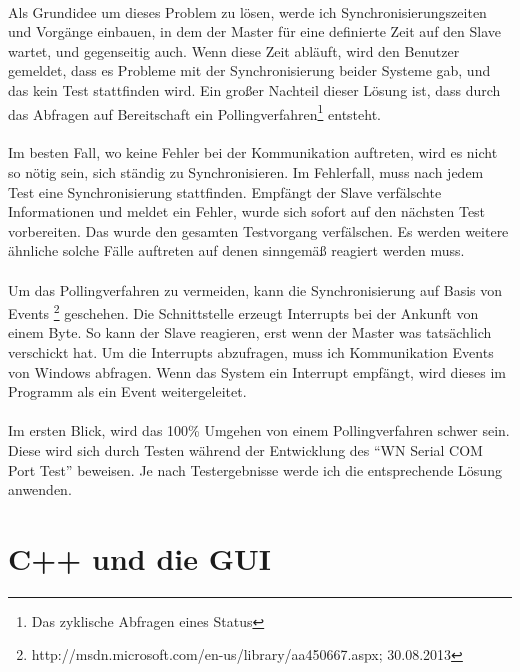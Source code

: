 \paragraph{}
Als Grundidee um dieses Problem zu lösen, werde ich Synchronisierungszeiten und Vorgänge einbauen, in dem der Master für eine definierte Zeit auf den Slave wartet, und gegenseitig auch. Wenn diese Zeit abläuft, wird den Benutzer gemeldet, dass es Probleme mit der Synchronisierung beider Systeme gab, und das kein Test stattfinden wird. Ein großer Nachteil dieser Lösung ist, dass durch das Abfragen auf Bereitschaft ein Pollingverfahren\footnote{Das zyklische Abfragen eines Status} entsteht. 

\paragraph{}
Im besten Fall, wo keine Fehler bei der Kommunikation auftreten, wird es nicht so nötig sein, sich ständig zu Synchronisieren. Im Fehlerfall, muss nach jedem Test eine Synchronisierung stattfinden. Empfängt der Slave verfälschte Informationen und meldet ein Fehler, wurde sich sofort auf den nächsten Test vorbereiten. Das wurde den gesamten Testvorgang verfälschen. Es werden weitere ähnliche solche Fälle auftreten auf denen sinngemäß reagiert werden muss.

\paragraph{}
Um das Pollingverfahren zu vermeiden, kann die Synchronisierung auf Basis von Events \footnote{http://msdn.microsoft.com/en-us/library/aa450667.aspx; 30.08.2013} geschehen. Die Schnittstelle erzeugt Interrupts bei der Ankunft von einem Byte. So kann der Slave reagieren, erst wenn der Master was tatsächlich verschickt hat. Um die Interrupts abzufragen, muss ich Kommunikation Events von Windows abfragen. Wenn das System ein Interrupt empfängt, wird dieses im Programm als ein Event weitergeleitet.

\paragraph{}
Im ersten Blick, wird das 100\% Umgehen von einem Pollingverfahren schwer sein. Diese wird sich durch Testen während der Entwicklung des "`WN Serial COM Port Test"' beweisen. Je nach Testergebnisse werde ich die entsprechende Lösung anwenden.


\section{C++ und die GUI}\label{C++GUILoesung}
